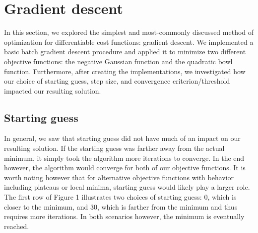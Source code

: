 \documentclass{article}
\begin{document}

\section{Gradient descent}
In this section, we explored the simplest and most-commonly discussed method of optimization for differentiable cost functions: gradient descent. We implemented a basic batch gradient descent procedure and applied it to minimize two different objective functions: the negative Gaussian function and the quadratic bowl function. Furthermore, after creating the implementations, we investigated how our choice of starting guess, step size, and convergence criterion/threshold impacted our resulting solution.

\subsection{Starting guess}
In general, we saw that starting guess did not have much of an impact on our resulting solution. If the starting guess was farther away from the actual minimum, it simply took the algorithm more iterations to converge. In the end however, the algorithm would converge for both of our objective functions. It is worth noting however that for alternative objective functions with behavior including plateaus or local minima, starting guess would likely play a larger role. The first row of Figure 1 illustrates two choices of starting guess: 0, which is closer to the minimum, and 30, which is farther from the minimum and thus requires more iterations. In both scenarios however, the minimum is eventually reached.
\end{document}
